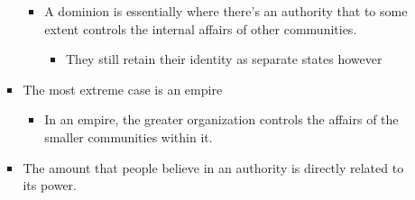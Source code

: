 \documentclass[letterpaper]{article}
\begin{document}
\begin{itemize}
\begin{itemize}
\begin{itemize}
\begin{itemize}
\item A dominion is essentially where there's an authority that to
some extent controls the internal affairs of other communities.

\begin{itemize}
\item They still retain their identity as separate states however
\end{itemize}
\end{itemize}

\item The most extreme case is an empire

\begin{itemize}
\item In an empire, the greater organization controls the affairs of
the smaller communities within it.
\end{itemize}

\item The amount that people believe in an authority is directly related
to its power.
\end{itemize}
\end{itemize}
\end{itemize}
\end{document}
